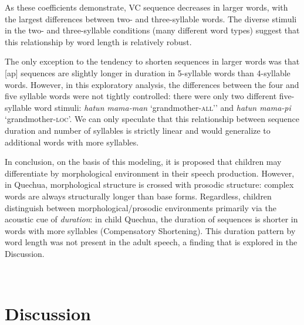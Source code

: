 \documentclass[a4paper,man,floatsintext,natbib,donotrepeattitle, apacite]{apa6}
\begin{document}
As these coefficients demonstrate, VC sequence decreases in larger words, with the largest differences between two- and three-syllable words. The diverse stimuli in the two- and three-syllable conditions (many different word types) suggest that this relationship by word length is relatively robust.

The only exception to the tendency to shorten sequences in larger words was that {[}ap{]} sequences are slightly longer in duration in 5-syllable words than 4-syllable words. However, in this exploratory analysis, the differences between the four and five syllable words were not tightly controlled: there were only two different five-syllable word stimuli: \emph{hatun mama-man} `grandmother-\textsc{all}'' and \emph{hatun mama-pi} `grandmother-\textsc{loc}'. We can only speculate that this relationship between sequence duration and number of syllables is strictly linear and would generalize to additional words with more syllables.

In conclusion, on the basis of this modeling, it is proposed that children may differentiate by morphological environment in their speech production. However, in Quechua, morphological structure is crossed with prosodic structure: complex words are always structurally longer than base forms. Regardless, children distinguish between morphological/prosodic environments primarily via the acoustic cue of \emph{duration}: in child Quechua, the duration of sequences is shorter in words with more syllables (Compensatory Shortening). This duration pattern by word length was not present in the adult speech, a finding that is explored in the Discussion.

~
~

\section{Discussion}
\end{document}
